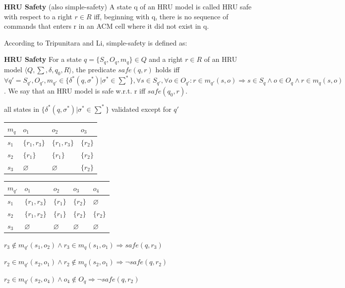\documentclass[a4paper]{article}
\renewcommand{\note}[2]{\begin{noteBox} \textbf{#1} #2 \end{noteBox}}
\begin{document}
\begin{multicols}{3}
    \note{HRU Safety}{(also simple-safety) A state q of an HRU model is called HRU safe with respect to a right $r\in R$ iff, beginning with q, there is no sequence of commands that enters r in an ACM cell where it did not exist in q.}

    According to Tripunitara and Li, simple-safety is defined as:

    \note{HRU Safety}{For a state $q=\{S_q,O_q,m_q\}\in Q$ and a right $r\in R$ of an HRU model $⟨Q,\sum,\delta,q_0,R⟩$, the predicate $safe(q,r)$ holds iff
    $\forall q'= S_{q'},O_{q'},m_{q'} \in \{\delta^*(q,\sigma^*)|\sigma^*\in\sum^*\},\forall s\in S_{q'},\forall o\in O_{q'}: r\in m_{q'}(s,o)\Rightarrow s\in S_q \wedge o\in O_q \wedge r\in m_q(s,o)$.
    We say that an HRU model is safe w.r.t. r iff $safe(q_0 ,r)$.}

    all states in $\{\delta^*(q,\sigma^*)|\sigma^*\in\sum^*\}$ validated except for $q'$
    \begin{tabular}{l|l|l|l}
        $m_q$ & $o_1$         & $o_2$         & $o_3$     \\\hline
        $s_1$ & $\{r_1,r_3\}$ & $\{r_1,r_3\}$ & $\{r_2\}$ \\
        $s_2$ & $\{r_1\}$     & $\{r_1\}$     & $\{r_2\}$ \\
        $s_3$ & $\varnothing$ & $\varnothing$ & $\{r_2\}$
    \end{tabular}
    \begin{tabular}{l|l|l|l|l}
        $m_{q'}$ & $o_1$         & $o_2$         & $o_3$         & $o_4$         \\\hline
        $s_1$    & $\{r_1,r_3\}$ & $\{r_1\}$     & $\{r_2\}$     & $\varnothing$ \\
        $s_2$    & $\{r_1,r_2\}$ & $\{r_1\}$     & $\{r_2\}$     & $\{r_2\}$     \\
        $s_3$    & $\varnothing$ & $\varnothing$ & $\varnothing$ & $\varnothing$
    \end{tabular}
    \begin{itemize*}
        \item $r_3\not\in m_{q'}(s_1,o_2)\wedge r_3\in m_q(s_1,o_1)\Rightarrow safe(q,r_3)$
        \item $r_2\in m_{q'}(s_2,o_1)\wedge r_2 \not\in m_q(s_2,o_1)\Rightarrow\lnot safe(q,r_2)$
        \item $r_2\in m_{q'}(s_2,o_4)\wedge o_4\not\in O_q\Rightarrow\lnot safe(q,r_2)$
    \end{itemize*}


\end{multicols}
\end{document}
